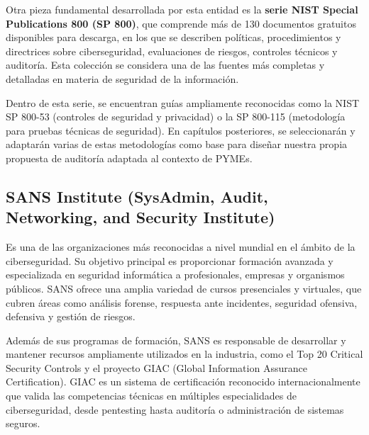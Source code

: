 \documentclass[a4paper, 10pt]{article}
\begin{document}
Otra pieza fundamental desarrollada por esta entidad es la \textbf{serie NIST Special Publications 800 (SP 800)}, que comprende más de 130 documentos gratuitos disponibles para descarga, en los que se describen políticas, procedimientos y directrices sobre ciberseguridad, evaluaciones de riesgos, controles técnicos y auditoría. Esta colección se considera una de las fuentes más completas y detalladas en materia de seguridad de la información.
\par\vspace{0.5cm}

Dentro de esta serie, se encuentran guías ampliamente reconocidas como la NIST SP 800-53 (controles de seguridad y privacidad) o la SP 800-115 (metodología para pruebas técnicas de seguridad). En capítulos posteriores, se seleccionarán y adaptarán varias de estas metodologías como base para diseñar nuestra propia propuesta de auditoría adaptada al contexto de PYMEs.


\par\vspace{0.5cm}



\subsection*{SANS Institute (SysAdmin, Audit, Networking, and Security Institute)}
Es una de las organizaciones más reconocidas a nivel mundial en el ámbito de la ciberseguridad. 
Su objetivo principal es proporcionar formación avanzada y especializada en seguridad informática a profesionales, empresas y organismos públicos. SANS ofrece una amplia 
variedad de cursos presenciales y virtuales, que cubren áreas como análisis forense, respuesta ante incidentes, seguridad ofensiva, defensiva y gestión de riesgos.
\par\vspace{0.5cm}

Además de sus programas de formación, SANS es responsable de desarrollar y mantener recursos ampliamente utilizados en la industria, como el Top 20 Critical Security Controls y el proyecto GIAC (Global Information Assurance Certification). GIAC es un sistema de certificación reconocido internacionalmente que valida las competencias técnicas en múltiples especialidades de ciberseguridad, desde pentesting hasta auditoría o administración de sistemas seguros. \cite{sans}
\par\vspace{0.5cm}
\end{document}
